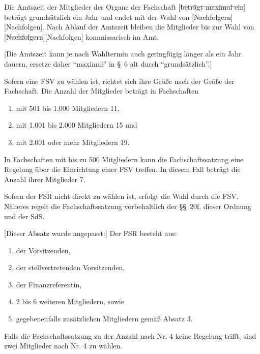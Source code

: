 \documentclass[%
draft,%
multilinesections%
]{fswo}
\newcommand\oldT[1]  {{\color{Gray}[\st{#1}]}}
\newcommand\newT[1]  {{\color{Green}[#1]}}
\newcommand\bemFr[1] {{\color{Red}[#1]}}
\newcommand\bemFe[1] {{\color{Cyan}[#1]}}
\newcommand\oldT[1]{}%
\newcommand\newT[1]{#1}
\newcommand\bemFr[1]{}%
\newcommand\bemFe[1]{}%
\newcommand\change[2]{\oldT{#1}\newT{#2}}
\begin{document}
\begin{contract}
Die Amtszeit der Mitglieder der Organe der Fachschaft \oldT{beträgt maximal ein} beträgt grundsätzlich ein Jahr und endet mit der Wahl von \change{Nachfolgern}{Nachfolgen}.
Nach Ablauf der Amtszeit bleiben die Mitglieder bis zur Wahl von \change{Nachfolgern}{Nachfolgen} kommissarisch im Amt.
\end{contract}

\bemFr{Die Amtszeit kann je nach Wahltermin auch geringfügig länger als ein Jahr dauern, ersetze daher \enquote{maximal} in \S~6 alt durch \enquote{grundsätzlich}.}

\begin{contract}
Sofern eine FSV zu wählen ist, richtet sich ihre Größe nach der Größe der Fachschaft.
Die Anzahl der Mitglieder beträgt in Fachschaften
\begin{enumerate}
  \item mit 501 bis 1.000 Mitgliedern 11,
  \item mit 1.001 bis 2.000 Mitgliedern 15 und
  \item mit 2.001 oder mehr Mitgliedern 19.
\end{enumerate}

In Fachschaften mit bis zu 500 Mitgliedern kann die Fachschaftssatzung eine Regelung über die Einrichtung einer FSV treffen.
In diesem Fall beträgt die Anzahl ihrer Mitglieder 7.

Sofern der FSR nicht direkt zu wählen ist, erfolgt die Wahl durch die FSV.
Näheres regelt die Fachschaftssatzung vorbehaltlich der \S\S~20f. dieser Ordnung und der SdS.


\bemFe{Dieser Absatz wurde angepasst:}
Der FSR besteht aus:
\begin{enumerate}
  \item der Vorsitzenden,
  \item der stellvertretenden Vorsitzenden,
  \item der Finanzreferentin,
  \item 2 bis 6 weiteren Mitgliedern, sowie
  \item gegebenenfalls zusätzlichen Mitgliedern gemäß Absatz 3.
\end{enumerate}
Falls die Fachschaftssatzung zu der Anzahl nach Nr. 4 keine Regelung trifft, sind zwei Mitglieder nach Nr. 4 zu wählen.


\end{contract}
\end{document}
